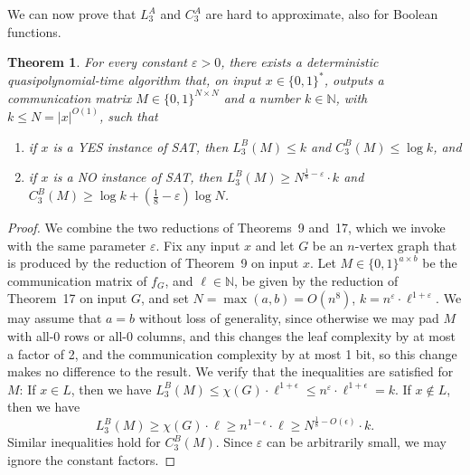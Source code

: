 \documentclass[10pt,a4paper]{article}
\newtheorem{theorem}{Theorem}
\begin{document}
We can now prove that $L_3^A$ and $C_3^A$ are hard to approximate, also for Boolean functions.
\begin{theorem}\label{thm:three-round-hardness}
For every constant $\varepsilon>0$, there exists a deterministic quasipolynomial-time algorithm that, on input $x\in\{0,1\}^*$, outputs a communication matrix $M\in\{0,1\}^{N\times N}$ and a number $k\in\mathbb N$, with $k\le N=|x|^{O(1)}$, such that
\begin{enumerate}
\item if $x$ is a YES instance of SAT, then $L_3^B(M)\le k$ and $C_3^B(M)\le\log k$, and
\item if $x$ is a NO instance of SAT, then $L_3^B(M)\ge N^{\frac18-\varepsilon}\cdot k$ and $C_3^B(M)\ge\log k+(\frac18-\varepsilon)\log N$.
\end{enumerate}
\end{theorem}
\begin{proof}
We combine the two reductions of Theorems~9 and~17, which we invoke with the same parameter $\varepsilon$. Fix any input $x$ and let $G$ be an $n$-vertex graph that is produced by the reduction of Theorem~9 on input $x$. Let $M\in\{0,1\}^{a\times b}$ be the communication matrix of $f_G$, and $\ell\in\mathbb N$, be given by the reduction of Theorem~17 on input $G$, and set $N=\max(a,b)=O(n^8)$, $k=n^\varepsilon\cdot\ell^{1+\varepsilon}$. We may assume that $a=b$ without loss of generality, since otherwise we may pad $M$ with all-0 rows or all-0 columns, and this changes the leaf complexity by at most a factor of 2, and the communication complexity by at most 1 bit, so this change makes no difference to the result.
We verify that the inequalities are satisfied for $M$: If $x\in L$, then we have $L_3^B(M)\le\chi(G)\cdot\ell^{1+\epsilon}\le n^\varepsilon\cdot\ell^{1+\epsilon}=k$. If $x\notin L$, then we have
\[L_3^B(M)\ge\chi(G)\cdot\ell\ge n^{1-\epsilon}\cdot\ell\ge N^{\frac18-O(\epsilon)}\cdot k.\]
Similar inequalities hold for $C_3^B(M)$. Since $\varepsilon$ can be arbitrarily small, we may ignore the constant factors.
\end{proof}
\end{document}

